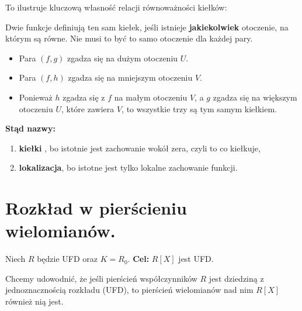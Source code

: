 To ilustruje kluczową własność relacji równoważności kiełków:

Dwie funkcje definiują ten sam kiełek, jeśli istnieje \textbf{jakiekolwiek} otoczenie, na którym są równe. Nie musi to być to samo otoczenie dla każdej pary.

\begin{itemize}
	\item Para $\left( f,g \right) $ zgadza się na dużym otoczeniu $U$.
	\item Para $\left( f,h \right) $ zgadza się na mniejszym otoczeniu $V$.
	\item Ponieważ $h$ zgadza się z $f$ na małym otoczeniu $V$, a $g$ zgadza się na większym otoczeniu $U$, które zawiera  $V$, to wszystkie trzy są tym samym kiełkiem.
\end{itemize}

\textbf{Stąd nazwy:}  
 \begin{enumerate}[label=\arabic*)]
 	\item \textbf{kiełki} , bo istotnie jest zachowanie wokół zera, czyli to co kiełkuje,
	\item \textbf{lokalizacja}, bo istotne jest tylko lokalne zachowanie funkcji.
 \end{enumerate}

 \section{Rozkład w pierścieniu wielomianów.}

 Niech $R$ będzie UFD oraz $K=R_{0}$. \textbf{Cel:} $R\left[ X \right] $ jest UFD.

\noindent Chcemy udowodnić, że jeśli pierścień współczynników $R$ jest dziedziną z jednoznacznością rozkładu (UFD), to pierścień wielomianów nad nim  $R\left[ X \right] $ również nią jest.

